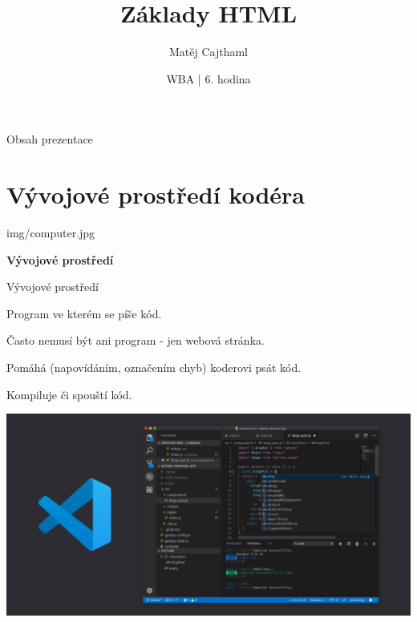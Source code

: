 \documentclass[aspectratio=1610]{beamer}
\title{Základy HTML}
\date{WBA | 6. hodina}
\author[Cajthaml]{Matěj Cajthaml}
\begin{document}
\begin{frame}
\titlepage
\end{frame}

\begin{frame}{Obsah prezentace}
    \begin{cardTiny}
        \begin{minipage}{\textwidth}
            \vspace{1ex}
            \tableofcontents
        \end{minipage}
    \end{cardTiny}
\end{frame}



\section{Vývojové prostředí kodéra}

\begin{frameImg}[width]{img/computer.jpg}
    \vspace*{60mm}
    \begin{cardTiny}
        \vspace*{\fill}
        \begin{center}
            \textbf{Vývojové prostředí}
        \end{center}
    \end{cardTiny}
\end{frameImg}

\begin{frame}{Vývojové prostředí}
    \begin{cardTiny}
        \begin{flushleft}
            Program ve kterém se píše kód.

            Často nemusí být ani program - jen webová stránka.

            Pomáhá (napovídáním, označením chyb) koderovi psát kód.

            Kompiluje či spouští kód.
        \end{flushleft}
    \end{cardTiny}
\end{frame}

\begin{frame}
    \begin{center}
        \includegraphics[width=\textwidth]{img/vscode.png}
    \end{center}
\end{frame}
\end{document}

